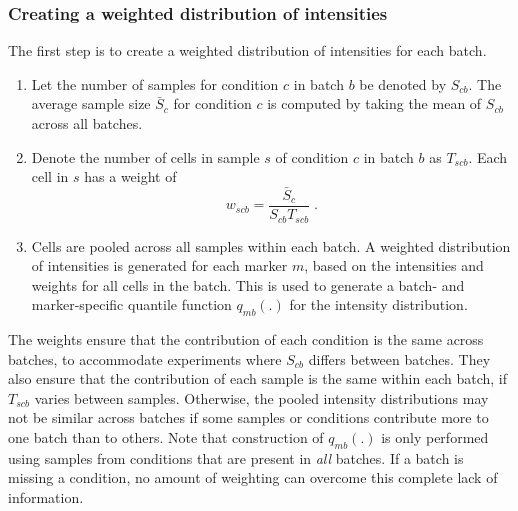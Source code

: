 \documentclass{article}
\begin{document}
\subsubsection{Creating a weighted distribution of intensities}
The first step is to create a weighted distribution of intensities for each batch.
\begin{enumerate}
    \item Let the number of samples for condition $c$ in batch $b$ be denoted by $S_{cb}$.
        The average sample size $\bar{S}_c$ for condition $c$ is computed by taking the mean of $S_{cb}$ across all batches.
    \item Denote the number of cells in sample $s$ of condition $c$ in batch $b$ as $T_{scb}$.
        Each cell in $s$ has a weight of 
        \[
            w_{scb} = \frac{\bar{S}_c}{S_{cb}T_{scb}} \;.
        \]
    \item Cells are pooled across all samples within each batch.
        A weighted distribution of intensities is generated for each marker $m$, based on the intensities and weights for all cells in the batch.
        This is used to generate a batch- and marker-specific quantile function $q_{mb}(.)$ for the intensity distribution.
\end{enumerate}
The weights ensure that the contribution of each condition is the same across batches, to accommodate experiments where $S_{cb}$ differs between batches.
They also ensure that the contribution of each sample is the same within each batch, if $T_{scb}$ varies between samples.
Otherwise, the pooled intensity distributions may not be similar across batches if some samples or conditions contribute more to one batch than to others.
Note that construction of $q_{mb}(.)$ is only performed using samples from conditions that are present in \textit{all} batches.
If a batch is missing a condition, no amount of weighting can overcome this complete lack of information.
\end{document}
